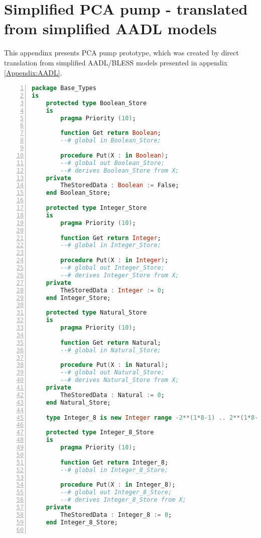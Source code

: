 
\cleardoublepage

\chapter{Simplified PCA pump - translated from simplified AADL models}
\label{Appendix:pca_generated}

This appendinx presents PCA pump prototype, which was created by direct translation from simplified AADL/BLESS models presented in appendix \ref{Appendix:AADL}.

\singlespacing
\begin{lstlisting}[language=ada, gobble=0, numbers=left, caption={\lstinline{Base_Types} package}, label={listing:pca_generated:base_types}]
package Base_Types
is
    protected type Boolean_Store
    is
        pragma Priority (10);

        function Get return Boolean;
        --# global in Boolean_Store;

        procedure Put(X : in Boolean);
        --# global out Boolean_Store;
        --# derives Boolean_Store from X;
    private
        TheStoredData : Boolean := False;
    end Boolean_Store;

    protected type Integer_Store
    is
        pragma Priority (10);

        function Get return Integer;
        --# global in Integer_Store;

        procedure Put(X : in Integer);
        --# global out Integer_Store;
        --# derives Integer_Store from X;
    private
        TheStoredData : Integer := 0;
    end Integer_Store;

    protected type Natural_Store
    is
        pragma Priority (10);

        function Get return Natural;
        --# global in Natural_Store;

        procedure Put(X : in Natural);
        --# global out Natural_Store;
        --# derives Natural_Store from X;
    private
        TheStoredData : Natural := 0;
    end Natural_Store;

    type Integer_8 is new Integer range -2**(1*8-1) .. 2**(1*8-1)-1;

    protected type Integer_8_Store
    is
        pragma Priority (10);

        function Get return Integer_8;
        --# global in Integer_8_Store;

        procedure Put(X : in Integer_8);
        --# global out Integer_8_Store;
        --# derives Integer_8_Store from X;
    private
        TheStoredData : Integer_8 := 0;
    end Integer_8_Store;


\end{lstlisting}

